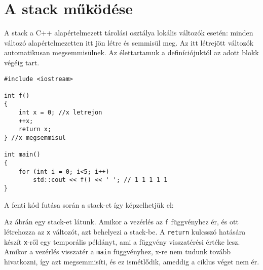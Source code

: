 \documentclass[a4paper,11.5pt,table]{article}
\begin{document}
	\section{A stack működése}
	A stack a C++ alapértelmezett tárolási osztálya lokális változók esetén: minden változó alapértelmezetten itt jön létre és semmisül meg. Az itt létrejött változók automatikusan megsemmisülnek. Az élettartamuk a definíciójuktól az adott blokk végéig tart.
	
	\begin{lstlisting}
#include <iostream>

int f()
{
	int x = 0; //x letrejon
	++x;
	return x;
} //x megsemmisul

int main()
{
	for (int i = 0; i<5; i++)
		std::cout << f() << ' '; // 1 1 1 1 1
}
	\end{lstlisting}
	\medskip
	
	A fenti kód futása során a stack-et így képzelhetjük el:
	
	\begin{figure}[!h]
		\centering
	\end{figure}
	Az ábrán egy stack-et látunk. Amikor a vezérlés az \texttt{f} függvényhez ér, és ott létrehozza az \texttt{x} változót, azt behelyezi a stack-be. A \texttt{return} kulcsszó hatására készít \texttt{x}-ről egy temporális példányt, ami a függvény visszatérési értéke lesz. Amikor a vezérlés visszatér a \texttt{main} függvényhez, {x}-re nem tudunk tovább hivatkozni, így azt megsemmisíti, és ez ismétlődik, ameddig a ciklus véget nem ér.
	\smallskip
	
\end{document}
